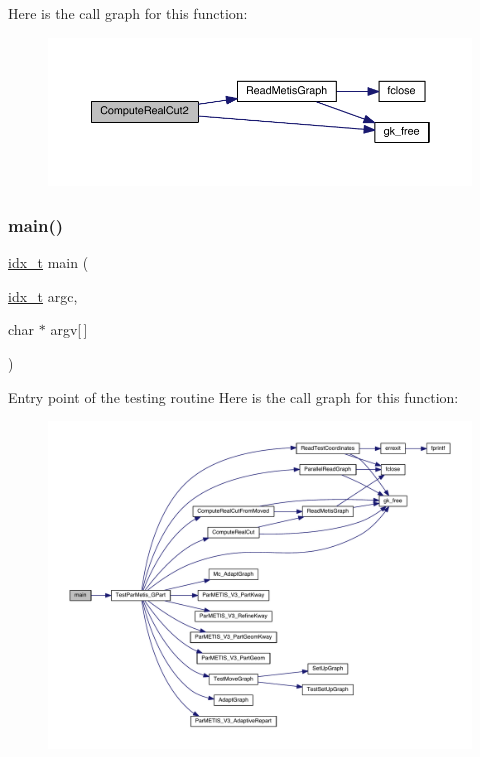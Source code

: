 Here is the call graph for this function\+:\nopagebreak
\begin{figure}[H]
\begin{center}
\leavevmode
\includegraphics[width=350pt]{a00428_a5bf6f2fe30133c3be1dc3d34329e650d_cgraph}
\end{center}
\end{figure}
\mbox{\label{a00428_a8f4019835796a39a97c345864d80fcbb}} 
\subsubsection{\texorpdfstring{main()}{main()}}
{\footnotesize\ttfamily \hyperlink{a00876_aaa5262be3e700770163401acb0150f52}{idx\+\_\+t} main (\begin{DoxyParamCaption}\item[{\hyperlink{a00876_aaa5262be3e700770163401acb0150f52}{idx\+\_\+t}}]{argc,  }\item[{char $\ast$}]{argv\mbox{[}$\,$\mbox{]} }\end{DoxyParamCaption})}

Entry point of the testing routine Here is the call graph for this function\+:\nopagebreak
\begin{figure}[H]
\begin{center}
\leavevmode
\includegraphics[width=350pt]{a00428_a8f4019835796a39a97c345864d80fcbb_cgraph}
\end{center}
\end{figure}
\mbox{\label{a00428_ac5472d28ea064341acff9be6744eea92}} 
